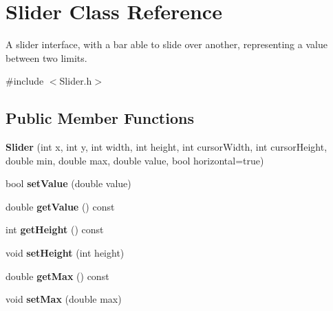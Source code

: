 \hypertarget{class_slider}{}\section{Slider Class Reference}
\label{class_slider}


A slider interface, with a bar able to slide over another, representing a value between two limits.  




{\ttfamily \#include $<$Slider.\+h$>$}

\subsection*{Public Member Functions}
\begin{DoxyCompactItemize}
\item 
\hypertarget{class_slider_ac456725827e4cdc35cb5d5c1e2662910}{}{\bfseries Slider} (int x, int y, int width, int height, int cursor\+Width, int cursor\+Height, double min, double max, double value, bool horizontal=true)\label{class_slider_ac456725827e4cdc35cb5d5c1e2662910}

\item 
\hypertarget{class_slider_a2909285efe7aa44f9ff1372fa679e842}{}bool {\bfseries set\+Value} (double value)\label{class_slider_a2909285efe7aa44f9ff1372fa679e842}

\item 
\hypertarget{class_slider_ace4fffe8ad4e2b2c4cd2cda06dedc848}{}double {\bfseries get\+Value} () const \label{class_slider_ace4fffe8ad4e2b2c4cd2cda06dedc848}

\item 
\hypertarget{class_slider_a579ee955a2b54659b00b1a42e32e3c66}{}int {\bfseries get\+Height} () const \label{class_slider_a579ee955a2b54659b00b1a42e32e3c66}

\item 
\hypertarget{class_slider_a670f1e9dd575682f3d41489ed11bfab6}{}void {\bfseries set\+Height} (int height)\label{class_slider_a670f1e9dd575682f3d41489ed11bfab6}

\item 
\hypertarget{class_slider_a5482e9d9ea595b16c9b47dc0dfe9145d}{}double {\bfseries get\+Max} () const \label{class_slider_a5482e9d9ea595b16c9b47dc0dfe9145d}

\item 
\hypertarget{class_slider_abcb2840e64fc0ff5efe25e54884aef2c}{}void {\bfseries set\+Max} (double max)\label{class_slider_abcb2840e64fc0ff5efe25e54884aef2c}


\end{DoxyCompactItemize}
